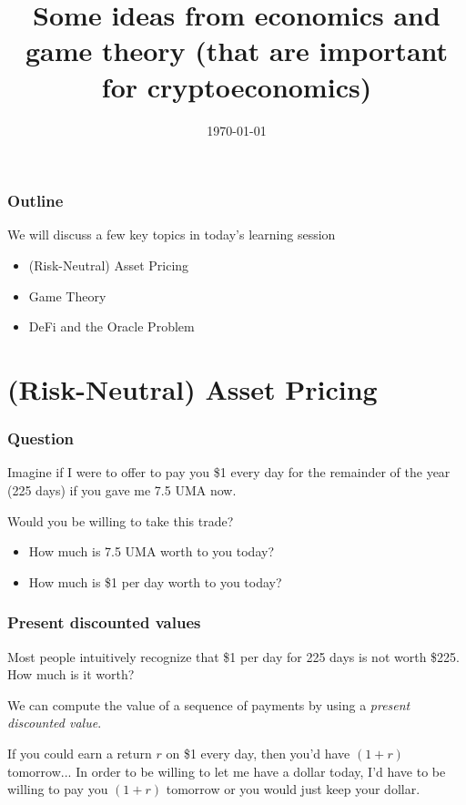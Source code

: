 \documentclass[10pt]{beamer}
\title{Some ideas from economics and game theory (that are important for cryptoeconomics)}
\date[]{\today}
\begin{document}
\begin{frame}
  \titlepage
\end{frame}


\begin{frame} \frametitle{Outline}
  We will discuss a few key topics in today's learning session

  \begin{itemize}
    \item (Risk-Neutral) Asset Pricing
    \item Game Theory
    \item DeFi and the Oracle Problem
  \end{itemize}

\end{frame}

\section{(Risk-Neutral) Asset Pricing}

  \begin{frame} \frametitle{Question}

    Imagine if I were to offer to pay you \$1 every day for the remainder of the year (225 days) if
    you gave me 7.5 UMA now.

    Would you be willing to take this trade?

    \begin{itemize}[<+->]
      \item <2-> How much is 7.5 UMA worth to you today?
      \item <3-> How much is \$1 per day worth to you today?
    \end{itemize}

  \end{frame}

  \begin{frame} \frametitle{Present discounted values}

    Most people intuitively recognize that \$1 per day for 225 days is not worth \$225. How much
    is it worth?

    We can compute the value of a sequence of payments by using a \textit{present discounted value}.

    If you could earn a return $r$ on \$1 every day, then you'd have $(1+r)$ tomorrow... In order to
    be willing to let me have a dollar today, I'd have to be willing to pay you $(1 + r)$ tomorrow
    or you would just keep your dollar.
  \end{frame}
\end{document}
